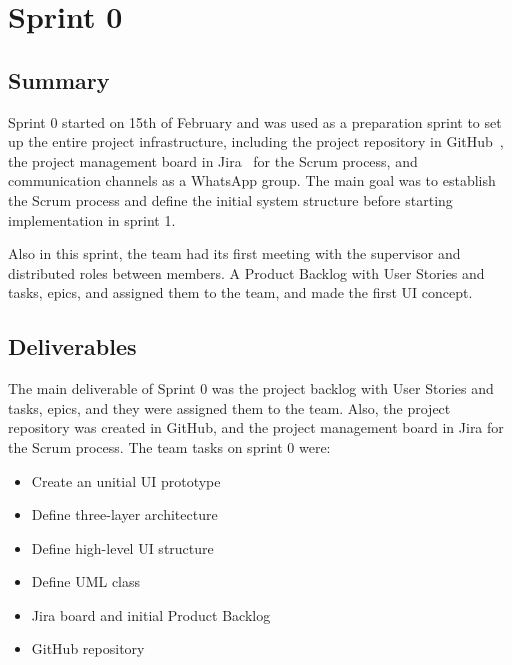 \section{Sprint 0}

 

\subsection*{Summary}

Sprint 0 started on 15th of February and was used as a preparation sprint to set up the entire project infrastructure, including the project repository in GitHub~\cite{github}, the project management board in Jira~\cite{jira} for the Scrum process, and communication channels as a WhatsApp group. The main goal was to establish the Scrum process and define the initial system structure before starting implementation in sprint 1. 

Also in this sprint, the team had its first meeting with the supervisor and distributed roles between members. A Product Backlog with User Stories and tasks, epics, and assigned them to the team, and made the first UI concept.

\subsection*{Deliverables}

The main deliverable of Sprint 0 was the project backlog with User Stories and tasks, epics, and they were assigned them to the team. Also, the project repository was created in GitHub, and the project management board in Jira for the Scrum process. The team tasks on sprint 0 were:

\begin{itemize}

    \item Create an unitial UI prototype

    \item Define three-layer architecture

    \item Define high-level UI structure

    \item Define UML class

    \item Jira board and initial Product Backlog
    
    \item GitHub repository

\end{itemize}

